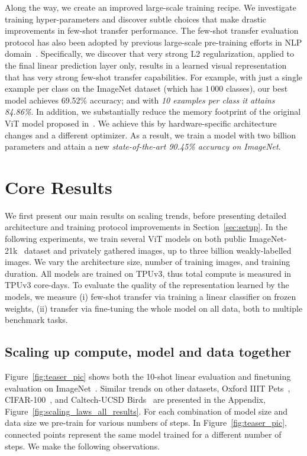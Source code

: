Along the way, we create an improved large-scale training recipe. We investigate training hyper-parameters and discover subtle choices that make drastic improvements in few-shot transfer performance. 
The few-shot transfer evaluation protocol has also been adopted by previous large-scale pre-training efforts in NLP domain~\cite{gpt3}.
Specifically, we discover that very strong L2 regularization, applied to the final linear prediction layer only, results in a learned visual representation that has very strong few-shot transfer capabilities.
For example, with just a single example per class on the ImageNet dataset (which has $1\,000$ classes), our best model achieves 69.52\% accuracy; and with \emph{10 examples per class it attains 84.86\%}.  In addition, we substantially reduce the memory footprint of the original ViT model proposed in~\cite{dosovitskiy2020}. We achieve this by hardware-specific architecture changes and a different optimizer. As a result, we train a model with two billion parameters and attain a new \emph{state-of-the-art 90.45\% accuracy on ImageNet}.

\section{Core Results}\label{sec:core}

We first present our main results on scaling trends, before presenting detailed architecture and training protocol improvements in Section~\ref{sec:setup}.
In the following experiments, we train several ViT models on both public ImageNet-21k~\cite{imagenet} dataset and privately gathered images, up to three billion weakly-labelled images.
We vary the architecture size, number of training images, and training duration.
All models are trained on TPUv3, thus total compute is measured in TPUv3 core-days.
To evaluate the quality of the representation learned by the models, we measure (i) few-shot transfer via training a linear classifier on frozen weights, (ii) transfer via fine-tuning the whole model on all data, both to multiple benchmark tasks.

\subsection{Scaling up compute, model and data together}\label{sec:scaling_up}

Figure~\ref{fig:teaser_pic} shows both the 10-shot linear evaluation and finetuning evaluation on ImageNet~\cite{imagenet}.
Similar trends on other datasets, Oxford IIIT Pets~\cite{pets}, CIFAR-100~\cite{cifar}, and Caltech-UCSD Birds~\cite{cub} are presented in the Appendix, Figure~\ref{fig:scaling_laws_all_results}.
For each combination of model size and data size we pre-train for various numbers of steps.
In Figure~\ref{fig:teaser_pic}, connected points represent the same model trained for a different number of steps. 
We make the following observations.

